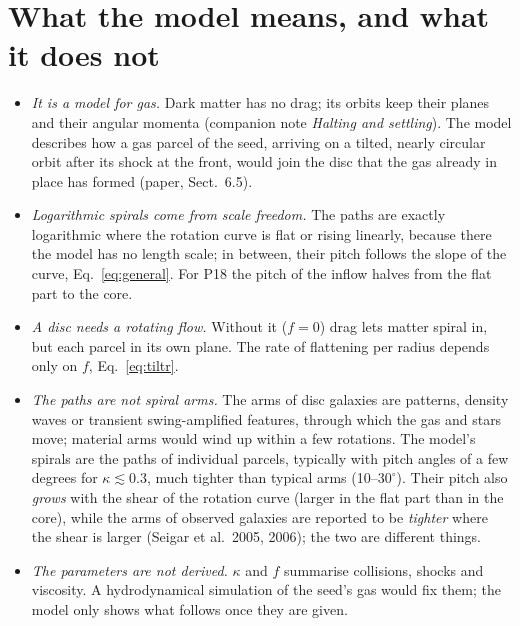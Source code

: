 \documentclass[11pt,a4paper]{article}
\begin{document}
\section{What the model means, and what it does not}
\begin{itemize}
\item \emph{It is a model for gas.} Dark matter has no drag; its orbits keep their
  planes and their angular momenta (companion note \emph{Halting and settling}). The model describes how a gas
  parcel of the seed, arriving on a tilted, nearly circular orbit after its shock at
  the front, would join the disc that the gas already in place has formed (paper,
  Sect.~6.5).
\item \emph{Logarithmic spirals come from scale freedom.} The paths are exactly
  logarithmic where the rotation curve is flat or rising linearly, because there the
  model has no length scale; in between, their pitch follows the slope of the curve,
  Eq.~\eqref{eq:general}. For P18 the pitch of the inflow halves from the flat part
  to the core.
\item \emph{A disc needs a rotating flow.} Without it ($f=0$) drag lets matter spiral
  in, but each parcel in its own plane. The rate of flattening per radius depends
  only on $f$, Eq.~\eqref{eq:tiltr}.
\item \emph{The paths are not spiral arms.} The arms of disc galaxies are patterns,
  density waves or transient swing-amplified features, through which the gas and
  stars move; material arms would wind up within a few rotations. The model's spirals
  are the paths of individual parcels, typically with pitch angles of a few degrees
  for $\kappa\lesssim0.3$, much tighter than typical arms (10--$30^\circ$). Their
  pitch also \emph{grows} with the shear of the rotation curve (larger in the flat
  part than in the core), while the arms of observed galaxies are reported to be
  \emph{tighter} where the shear is larger (Seigar et al.\ 2005, 2006); the two are
  different things.
\item \emph{The parameters are not derived.} $\kappa$ and $f$ summarise collisions,
  shocks and viscosity. A hydrodynamical simulation of the seed's gas would fix them;
  the model only shows what follows once they are given.
\end{itemize}
\end{document}
